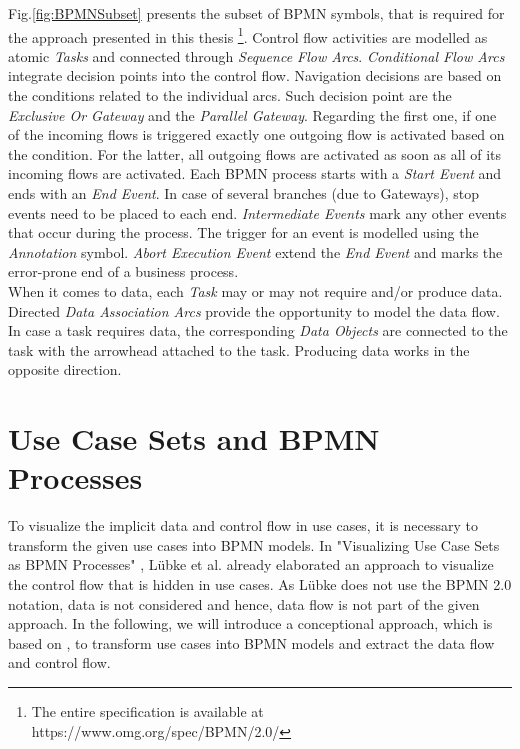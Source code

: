 \noindent
Fig.\ref{fig:BPMNSubset} presents the subset of BPMN symbols, that is required for the approach presented in this thesis \footnote{The entire specification is available at https://www.omg.org/spec/BPMN/2.0/}. Control flow activities are modelled as atomic \textit{Tasks} and connected through \textit{Sequence Flow Arcs}. \textit{Conditional Flow Arcs} integrate decision points into the control flow. Navigation decisions are based on the conditions related to the individual arcs. Such decision point are the \textit{Exclusive Or Gateway} and the \textit{Parallel Gateway}. Regarding the first one, if one of the incoming flows is triggered exactly one outgoing flow is activated based on the condition. For the latter, all outgoing flows are activated as soon as all of its incoming flows are activated. Each BPMN process starts with a \textit{Start Event} and ends with an \textit{End Event}. In case of several branches (due to Gateways), stop events need to be placed to each end. \textit{Intermediate Events} mark any other events that occur during the process. The trigger for an event is modelled using the \textit{Annotation} symbol. \textit{Abort Execution Event} extend the \textit{End Event} and marks the error-prone end of a business process. \\
When it comes to data, each \textit{Task} may or may not require and/or produce data. Directed \textit{Data Association Arcs} provide the opportunity to model the data flow. In case a task requires data, the corresponding \textit{Data Objects} are connected to the task with the arrowhead attached to the task. Producing data works in the opposite direction. \\









\section{Use Case Sets and BPMN Processes}
\label{sec:Fundamentals:TransformUCtoBPMN}
To visualize the implicit data and control flow in use cases, it is necessary to transform the given use cases into BPMN models. In "Visualizing Use Case Sets as BPMN Processes" \cite{VisualizeBPMN}, Lübke et al. already elaborated an approach to visualize the control flow that is hidden in use cases. As Lübke does not use the BPMN 2.0 notation, data is not considered and hence, data flow is not part of the given approach. In the following, we will introduce a conceptional approach, which is based on \cite{VisualizeBPMN}, to transform use cases into BPMN models and extract the data flow and control flow.


